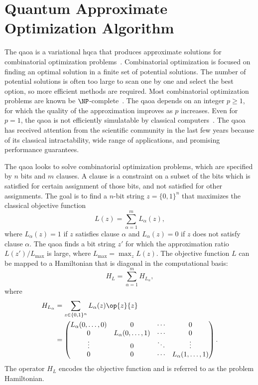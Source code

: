 \section{Quantum Approximate Optimization Algorithm} \label{sec:qaoa}
The \acrfull{qaoa} is a variational \gls{hqca} that produces approximate solutions for combinatorial optimization problems~\cite{farhi2014quantum}.
Combinatorial optimization is focused on finding an optimal solution in a finite set of potential solutions.
The number of potential solutions is often too large to scan one by one and select the best option, so more efficient methods are required.
Most combinatorial optimization problems are known be $\NP$-complete~\cite{schrijver2003combinatorial}.
The \gls{qaoa} depends on an integer $p \ge 1$, for which the quality of the approximation improves as $p$ increases.
Even for $p = 1$, the \gls{qaoa} is not efficiently simulatable by classical computers~\cite{farhi2016quantum}.
The \gls{qaoa} has received attention from the scientific community in the last few years because of its classical intractability, wide range of applications, and promising performance guarantees.

The \gls{qaoa} looks to solve combinatorial optimization problems, which are specified by $n$ bits and $m$ clauses.
A clause is a constraint on a subset of the bits which is satisfied for certain assignment of those bits, and not satisfied for other assignments.
The goal is to find a $n$-bit string $z = \{0,1\}^n$ that maximizes the classical objective function
\begin{equation} \label{eqn:objective-function}
L(z) = \sum_{\alpha=1}^m L_\alpha(z),
\end{equation}
where $L_\alpha(z) = 1$ if $z$ satisfies clause $\alpha$ and $L_\alpha(z) = 0$ if $z$ does not satisfy clause $\alpha$.
The \gls{qaoa} finds a bit string $z'$ for which the approximation ratio $L(z')/L_{\text{max}}$ is large, where $L_{\text{max}} = \max_z L(z)$.
The objective function $L$ can be mapped to a Hamiltonian that is diagonal in the computational basis:
\begin{equation}
H_L = \sum_{\alpha=1}^m H_{L_\alpha},
\end{equation}
where
\begin{align}
H_{L_\alpha} &= \sum_{z \in \{0, 1\}^n} L_\alpha(z) \op{z}{z} \\
&=
\begin{pmatrix}
L_\alpha(0,\ldots,0) & 0 & \cdots & 0 \\
0 & L_\alpha(0,\ldots,1) & \cdots & 0 \\
\vdots & 0 & \ddots & \vdots \\
0 & 0 & \cdots & L_\alpha(1,\ldots,1)
\end{pmatrix}.
\end{align}
The operator $H_L$ encodes the objective function and is referred to as the problem Hamiltonian.

